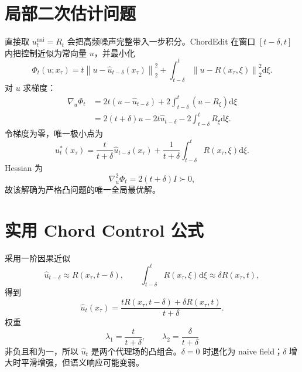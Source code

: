 \documentclass[UTF8,12pt,a4paper,fontset=none]{ctexart}
\numberwithin{equation}{section}
\newcommand{\norm}[1]{\left\lVert #1\right\rVert}
\newcommand{\dd}{\mathrm{d}}
\begin{document}
\section{局部二次估计问题}
直接取 $u_t^{\mathrm{nai}}=R_t$ 会把高频噪声完整带入一步积分。ChordEdit 在窗口 $[t-\delta,t]$ 内把控制近似为常向量 $u$，并最小化
\begin{equation}
 \Phi_t(u;x_\tau)
 =t\norm{u-\widehat u_{t-\delta}(x_\tau)}_2^2
 +\int_{t-\delta}^{t}\norm{u-R(x_\tau,\xi)}_2^2\dd\xi.
\end{equation}
对 $u$ 求梯度：
\begin{align}
 \nabla_u\Phi_t
 &=2t(u-\widehat u_{t-\delta})
 +2\int_{t-\delta}^{t}(u-R_\xi)\dd\xi\\
 &=2(t+\delta)u
 -2t\widehat u_{t-\delta}
 -2\int_{t-\delta}^{t}R_\xi\dd\xi.
\end{align}
令梯度为零，唯一极小点为
\begin{equation}
 \boxed{
 u_t^*(x_\tau)
 =\frac{t}{t+\delta}\widehat u_{t-\delta}(x_\tau)
 +\frac1{t+\delta}\int_{t-\delta}^{t}R(x_\tau,\xi)\dd\xi.
 }
\end{equation}
Hessian 为
\begin{equation}
 \nabla_u^2\Phi_t=2(t+\delta)I\succ0,
\end{equation}
故该解确为严格凸问题的唯一全局最优解。

\section{实用 Chord Control 公式}
采用一阶因果近似
\begin{equation}
 \widehat u_{t-\delta}\approx R(x_\tau,t-\delta),
 \qquad
 \int_{t-\delta}^{t}R(x_\tau,\xi)\dd\xi
 \approx\delta R(x_\tau,t),
\end{equation}
得到
\begin{equation}
 \boxed{
 \widehat u_t(x_\tau)
 =\frac{tR(x_\tau,t-\delta)+\delta R(x_\tau,t)}{t+\delta}.
 }
\end{equation}
权重
\begin{equation}
 \lambda_1=\frac{t}{t+\delta},\qquad
 \lambda_2=\frac{\delta}{t+\delta}
\end{equation}
非负且和为一，所以 $\widehat u_t$ 是两个代理场的凸组合。$\delta=0$ 时退化为 naive field；$\delta$ 增大时平滑增强，但语义响应可能变弱。
\end{document}
